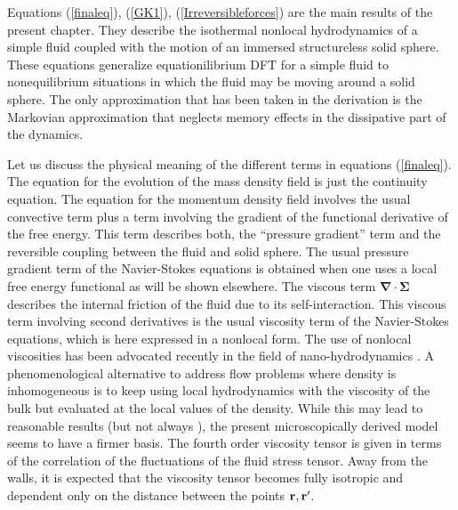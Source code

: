 \documentclass[b5paper,openright,10pt]{book}
\newcommand{\esc}{\!\cdot\!}
\begin{document}
Equations   (\ref{finaleq}), (\ref{GK1}),   (\ref{Irreversibleforces}) 
are the  main results of the present  chapter.  They describe
the isothermal nonlocal  hydrodynamics of a  simple fluid coupled with
the motion of an immersed structureless solid sphere.  These equations
generalize equationilibrium DFT for a simple fluid to
nonequilibrium situations in  which the fluid may be  moving around a
solid  sphere.  The  only approximation  that  has been  taken in  the
derivation is the Markovian approximation that neglects memory effects
in the dissipative part of the dynamics.

Let  us  discuss  the  physical  meaning of  the  different  terms  in
equations  (\ref{finaleq}).  The  equation for  the evolution  of the  mass
density field is  just the continuity equation.  The  equation for the
momentum density field involves the  usual convective term plus a term
involving  the  gradient of  the  functional  derivative of  the  free
energy.  This term describes both,  the ``pressure gradient'' term and
the reversible coupling between the  fluid and solid sphere. The usual
pressure gradient term of the Navier-Stokes equations is obtained when
one  uses   a  local   free  energy  functional   as  will   be  shown
elsewhere.               The                viscous               term
$\boldsymbol{\nabla}\esc\boldsymbol{\Sigma}$  
describes   the  internal   friction   of  the   fluid   due  to   its
self-interaction.  This  viscous term involving second  derivatives is
the usual viscosity term of the Navier-Stokes equations, which is here
expressed in a  nonlocal form.  The use of  nonlocal viscosities has
been   advocated  recently   in   the   field  of   nano-hydrodynamics
\cite{Zhang2004,Hansen2007,Todd2008a,Hansen2011}.  A phenomenological
alternative to address flow problems where density is inhomogeneous is
to keep using  local hydrodynamics with the viscosity of  the bulk but
evaluated at the local values of the density\cite{Bitsanis1987}. While
this   may    lead   to    reasonable   results   (but    not   always
\cite{Bitsanis1990}), the present  microscopically derived model seems
to have a firmer basis. The  fourth order viscosity tensor is given in
terms  of the  correlation of  the  fluctuations of  the fluid  stress
tensor.  Away from the walls, it is expected that the viscosity tensor
becomes fully isotropic and dependent only on the distance between the
points ${\bf r},{\bf r}'$.
\end{document}
